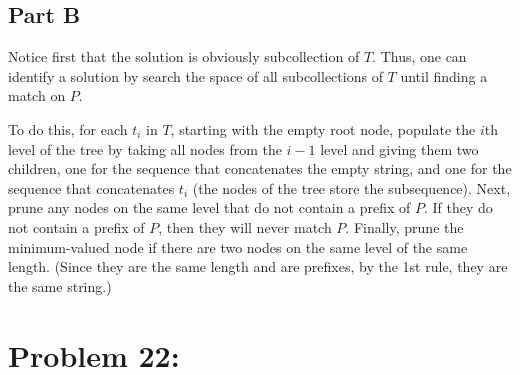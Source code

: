 \documentclass[12pt]{article}
\begin{document}
\subsection{Part B}

Notice first that the solution is obviously subcollection of $T$. Thus, one can identify a solution by search the space of all subcollections of $T$ until finding a match on $P$.

To do this, for each $t_{i}$ in $T$, starting with the empty root node, populate the $i$th level of the tree by taking all nodes from the $i-1$ level and giving them two children, one for the sequence that concatenates the empty string, and one for the sequence that concatenates $t_{i}$ (the nodes of the tree store the subsequence). Next, prune any nodes on the same level that do not contain a prefix of $P$. If they do not contain a prefix of $P$, then they will never match $P$. Finally, prune the minimum-valued node if there are two nodes on the same level of the same length. (Since they are the same length and are prefixes, by the 1st rule, they are the same string.)

\section*{Problem 22: }
\end{document}
